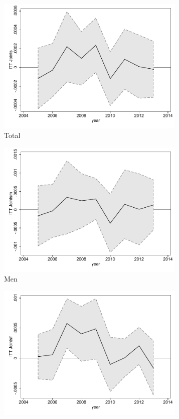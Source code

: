 \documentclass[a4paper ]{article}
\begin{document}
\begin{figure}[h!]
	\centering
	\begin{subfigure}[t]{0.31\textwidth}
		\centering
		\includegraphics[width=0.99\textwidth]{R1_LC_Joints}
		\caption{Total}		
	\end{subfigure}
	\begin{subfigure}[t]{0.31\textwidth}
		\centering
		\includegraphics[width=0.99\textwidth]{R1_LC_Jointsm}
		\caption{Men}		
	\end{subfigure}
	\quad
	\begin{subfigure}[t]{0.31\textwidth}
		\centering
		\includegraphics[width=0.99\textwidth]{R1_LC_Jointsf}

\end{subfigure}
\end{figure}
\end{document}

